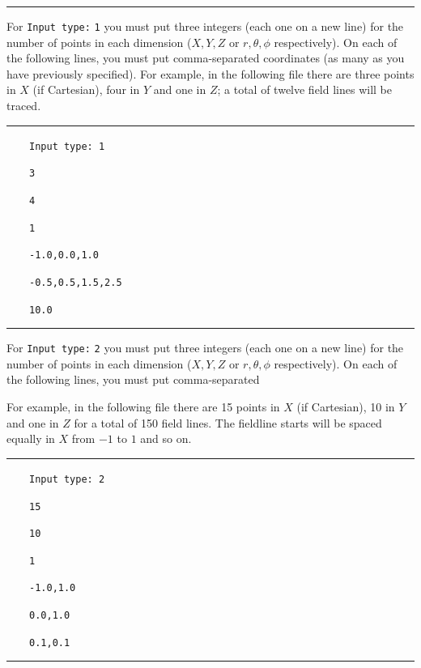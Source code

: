 \documentclass[12pt,twoside]{article}
\begin{document}
\noindent\rule{\linewidth}{0.4pt}

\vspace{2mm}

For \texttt{Input type:} \texttt{1} you must put three integers (each one on a new line) for the number of points in each dimension ($X,Y,Z$ or $r,\theta,\phi$ respectively). On each of the following lines, you must put comma-separated coordinates (as many as you have previously specified). For example, in the following file there are three points in $X$ (if Cartesian), four in $Y$ and one in $Z$; a total of twelve field lines will be traced.

\noindent\rule{\linewidth}{0.4pt}

$\quad\quad$\texttt{Input type: 1}

$\quad\quad$\texttt{3}

$\quad\quad$\texttt{4}

$\quad\quad$\texttt{1}

$\quad\quad$\texttt{-1.0,0.0,1.0}

$\quad\quad$\texttt{-0.5,0.5,1.5,2.5}

$\quad\quad$\texttt{10.0}

\noindent\rule{\linewidth}{0.4pt}

For \texttt{Input type:} \texttt{2} you must put three integers (each one on a new line) for the number of points in each dimension ($X,Y,Z$ or $r,\theta,\phi$ respectively). On each of the following lines, you must put comma-separated 

For example, in the following file there are 15 points in $X$ (if Cartesian), 10 in $Y$ and one in $Z$ for a total of 150 field lines. The fieldline starts will be spaced equally in $X$ from $-1$ to $1$ and so on.

\vspace{2mm}

\noindent\rule{\linewidth}{0.4pt}

$\quad\quad$\texttt{Input type: 2}

$\quad\quad$\texttt{15}

$\quad\quad$\texttt{10}

$\quad\quad$\texttt{1}

$\quad\quad$\texttt{-1.0,1.0}

$\quad\quad$\texttt{0.0,1.0}

$\quad\quad$\texttt{0.1,0.1}

\noindent\rule{\linewidth}{0.4pt}

\vspace{2mm}
\end{document}
